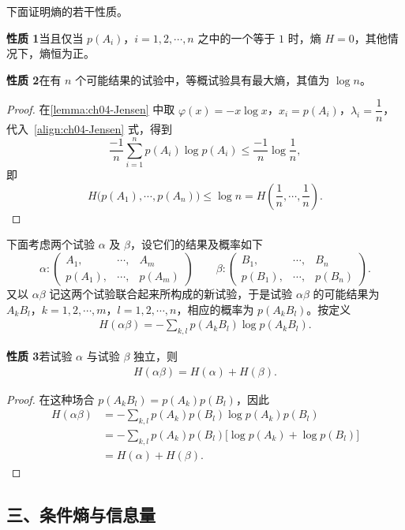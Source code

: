 \documentclass[../../main.tex]{subfiles}
\begin{document}
下面证明熵的若干性质。

\noindent\textbf{性质 1}\quad 当且仅当 $p(A_i)$，$i=1,2,\cdots,n$ 之中的一个等于 $1$ 时，熵 $H=0$，其他情况下，熵恒为正。

\noindent\textbf{性质 2}\quad 在有 $n$ 个可能结果的试验中，等概试验具有最大熵，其值为 $\log n$。

\begin{proof}
在\cref{lemma:ch04-Jensen} 中取 $\varphi(x)=-x\log x$，$x_i=p(A_i)$，$\lambda_i=\dfrac{1}{n}$，代入~\eqref{align:ch04-Jensen} 式，得到
\[
\frac{-1}{n}\sum_{i=1}^n p(A_i)\log p(A_i)\leqslant\frac{-1}{n}\log\frac{1}{n},
\]
即
\[
H\bigl(p(A_1),\cdots,p(A_n)\bigr)\leqslant\log n=H\left(\frac{1}{n},\cdots,\frac{1}{n}\right).
\]
\end{proof}

下面考虑两个试验 $\alpha$ 及 $\beta$，设它们的结果及概率如下
\[
\alpha:\begin{pmatrix}A_1,&\cdots,&A_m\\p(A_1),&\cdots,&p(A_m)\end{pmatrix}
\qquad
\beta:\begin{pmatrix}B_1,&\cdots,&B_n\\p(B_1),&\cdots,&p(B_n)\end{pmatrix}.
\]
又以 $\alpha\beta$ 记这两个试验联合起来所构成的新试验，于是试验 $\alpha\beta$ 的可能结果为 $A_k B_l$，$k=1,2,\cdots,m$，$l=1,2,\cdots,n$，相应的概率为 $p(A_k B_l)$。按定义
\begin{align}
H(\alpha\beta)=-\sum_{k,l}p(A_k B_l)\log p(A_k B_l).\label{align:ch04-联合熵}
\end{align}

\noindent\textbf{性质 3}\quad 若试验 $\alpha$ 与试验 $\beta$ 独立，则
\begin{align}
H(\alpha\beta)=H(\alpha)+H(\beta).\label{align:ch04-独立可加}
\end{align}

\begin{proof}
在这种场合 $p(A_k B_l)=p(A_k)p(B_l)$，因此
\begin{align*}
H(\alpha\beta)&=-\sum_{k,l}p(A_k)p(B_l)\log p(A_k)p(B_l)\\
&=-\sum_{k,l}p(A_k)p(B_l)\bigl[\log p(A_k)+\log p(B_l)\bigr]\\
&=H(\alpha)+H(\beta).
\end{align*}
\end{proof}

\subsection*{三、条件熵与信息量}
\end{document}
